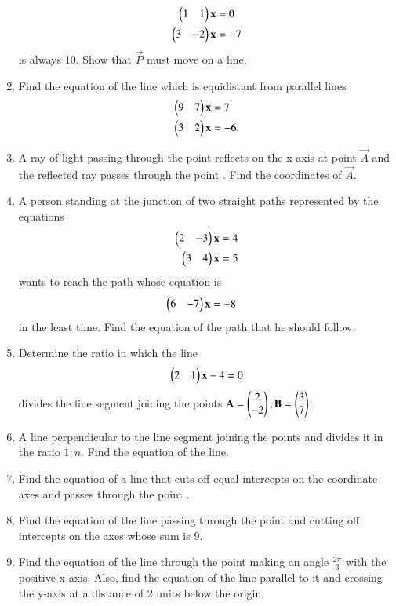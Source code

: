 \begin{enumerate}[label=\arabic*.,ref=\thesubsection.\theenumi]
%
\begin{align}
\begin{pmatrix}1 & 1\end{pmatrix}\mathbf{x} &= 0
\\
\begin{pmatrix}3 & -2\end{pmatrix}\mathbf{x} &= -7
\end{align}
%
is always 10.  Show that $\vec{P}$ must move on a line.
%
\item Find the equation of the line which is equidistant from parallel lines
%
\begin{align}
\begin{pmatrix}9 & 7\end{pmatrix}\mathbf{x} &= 7
\\
\begin{pmatrix}3 & 2\end{pmatrix}\mathbf{x} &= -6.
\end{align}
%
\item A ray of light passing through the point  reflects on the x-axis at point $\vec{A}$ and the reflected ray passes through the point .  Find the coordinates of $\vec{A}$.
\item A person standing at the junction of two straight paths represented by the equations 
%
\begin{align}
\begin{pmatrix}2 & -3\end{pmatrix}\mathbf{x} &= 4
\\
\begin{pmatrix}3 & 4\end{pmatrix}\mathbf{x} &= 5
\end{align}
%
wants to reach the path whose equation is
%
\begin{align}
\begin{pmatrix}6 & -7\end{pmatrix}\mathbf{x} &= -8
\end{align}
%
in the least time.  Find the equation of the path that he should follow.
\item Determine the ratio in which the line 
\begin{align}
\begin{pmatrix}2 & 1\end{pmatrix}\mathbf{x} - 4 = 0
\end{align}
%
divides the line segment joining the points $\mathbf{A}=\begin{pmatrix}2\\-2\end{pmatrix}, \mathbf{B}=\begin{pmatrix}3\\7\end{pmatrix}$.
\item A line perpendicular to the line segment joining the points  and  divides it in the ratio $1:n$.  Find the equation of the line.
\item Find the equation of a line that cuts off equal intercepts on the coordinate axes and passes through the point .
\item Find the equation of the line passing through the point  and cutting off intercepts on the axes whose sum is 9.
\item Find the equation of the line through the point  making an angle $\frac{2\pi}{3}$ with the positive x-axis.  Also, find the equation of the line parallel to it and crossing the y-axis at a distance of 2 units below the origin.

\end{enumerate}
